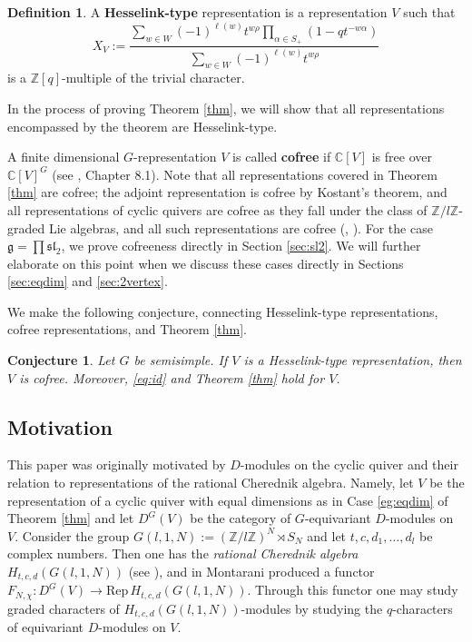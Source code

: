 \documentclass[12pt]{article}
\newcommand{\Z}{\mathbb{Z}}
\newcommand{\C}{\mathbb{C}}
\renewcommand{\sl}{\mathfrak{sl}}
\newtheorem{conjecture}[theorem]{Conjecture}
\theoremstyle{definition}
\newtheorem{definition}[theorem]{Definition}
\theoremstyle{remark}
\newcommand{\g}{\mathfrak{g}}
\begin{document}
\begin{definition}\label{def:hesselink}
    A \textbf{Hesselink-type} representation is a representation $V$ such that
    \[X_V:=\frac{\sum_{w\in W}(-1)^{\ell(w)}t^{w\rho}\prod_{\alpha\in S_+}(1-qt^{-w\alpha})}{\sum_{w\in W}(-1)^{\ell(w)}t^{w\rho}}\]
    is a $\Z[q]$-multiple of the trivial character.
\end{definition}

In the process of proving Theorem \ref{thm}, we will show that all representations encompassed by the theorem are Hesselink-type.

A finite dimensional $G$-representation $V$ is called \textbf{cofree} if $\C[V]$ is free over $\C[V]^G$ (see \cite{book}, Chapter 8.1). Note that all representations covered in Theorem \ref{thm} are cofree; the adjoint representation is cofree by Kostant's theorem, and all representations of cyclic quivers are cofree as they fall under the class of $\Z/l\Z$-graded Lie algebras, and all such representations are cofree (\cite{vinberg}, \cite{book}). For the case $\g=\prod\sl_2$, we prove cofreeness directly in Section \ref{sec:sl2}. We will further elaborate on this point when we discuss these cases directly in Sections \ref{sec:eqdim} and \ref{sec:2vertex}.

We make the following conjecture, connecting Hesselink-type representations, cofree representations, and Theorem \ref{thm}.

\begin{conjecture}\label{conj:cofree}
    Let $G$ be semisimple. If $V$ is a Hesselink-type representation, then $V$ is cofree. Moreover, \eqref{eq:id} and Theorem \ref{thm} hold for $V$.
\end{conjecture}

\subsection{Motivation}

This paper was originally motivated by $D$-modules on the cyclic quiver and their relation to representations of the rational Cherednik algebra. Namely, let $V$ be the representation of a cyclic quiver with equal dimensions as in Case \ref{eg:eqdim} of Theorem \ref{thm} and let $D^G(V)$ be the category of $G$-equivariant $D$-modules on $V$. Consider the group $G(l,1,N):=(\Z/l\Z)^N\rtimes S_N$ and let $t,c,d_1,\dots,d_l$ be complex numbers. Then one has the \emph{rational Cherednik algebra} $H_{t,c,d}(G(l,1,N))$ (see \cite{rationalcherednik}), and in \cite{montarani} Montarani produced a functor $F_{N,\chi}:D^G(V)\to\text{Rep}\,H_{t,c,d}(G(l,1,N))$. Through this functor one may study graded characters of $H_{t,c,d}(G(l,1,N))$-modules by studying the $q$-characters of equivariant $D$-modules on $V$. 
\end{document}
